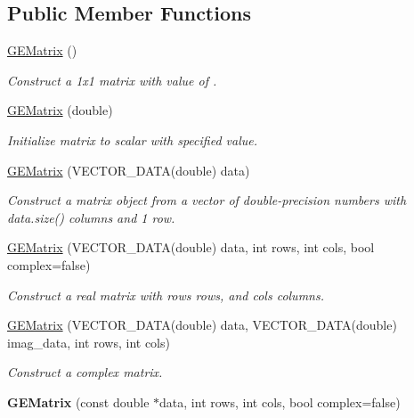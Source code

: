 \subsection*{Public Member Functions}
\begin{DoxyCompactItemize}
\item 
\hyperlink{class_g_e_matrix_a8efdf9ec85fdcfa0e9f1317722e81c52}{G\+E\+Matrix} ()
\begin{DoxyCompactList}\small\item\em Construct a {\ttfamily 1x1} matrix with value of {}. \end{DoxyCompactList}\item 
\hyperlink{class_g_e_matrix_af9ebcc214a2086c4692fa107c3ee53e9}{G\+E\+Matrix} (double)
\begin{DoxyCompactList}\small\item\em Initialize matrix to scalar with specified value. \end{DoxyCompactList}\item 
\hyperlink{class_g_e_matrix_a3bb7449ba121b12b1944b96ecae38cdc}{G\+E\+Matrix} (V\+E\+C\+T\+O\+R\+\_\+\+D\+A\+TA(double) data)
\begin{DoxyCompactList}\small\item\em Construct a matrix object from a vector of double-\/precision numbers with {\ttfamily data.\+size()} columns and 1 row. \end{DoxyCompactList}\item 
\hyperlink{class_g_e_matrix_a9ae1f7a7a5fe51d899d14ce95d02f420}{G\+E\+Matrix} (V\+E\+C\+T\+O\+R\+\_\+\+D\+A\+TA(double) data, int rows, int cols, bool complex=false)
\begin{DoxyCompactList}\small\item\em Construct a real matrix with {\itshape rows} rows, and {\itshape cols} columns. \end{DoxyCompactList}\item 
\hyperlink{class_g_e_matrix_a07bcbe0a34646e2003f178e7b613bfaa}{G\+E\+Matrix} (V\+E\+C\+T\+O\+R\+\_\+\+D\+A\+TA(double) data, V\+E\+C\+T\+O\+R\+\_\+\+D\+A\+TA(double) imag\+\_\+data, int rows, int cols)
\begin{DoxyCompactList}\small\item\em Construct a complex matrix. \end{DoxyCompactList}\item 
\mbox{\label{class_g_e_matrix_afae9a114a173fbdcb445c6427d02f31c}} 
{\bfseries G\+E\+Matrix} (const double $\ast$data, int rows, int cols, bool complex=false)

\end{DoxyCompactItemize}

